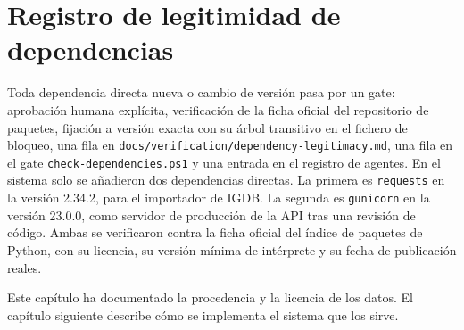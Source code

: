 \section{Registro de legitimidad de dependencias}\label{sec:datos-dependencias}

Toda dependencia directa nueva o cambio de versión pasa por un gate: aprobación humana
explícita, verificación de la ficha oficial del repositorio de paquetes, fijación a versión
exacta con su árbol transitivo en el fichero de bloqueo, una fila en
\texttt{docs/verification/dependency-legitimacy.md}, una fila en el gate
\texttt{check-dependencies.ps1} y una entrada en el registro de agentes. En el sistema solo
se añadieron dos dependencias directas. La primera es \texttt{requests} en la versión 2.34.2,
para el importador de IGDB. La segunda es \texttt{gunicorn} en la versión 23.0.0, como
servidor de producción de la API tras una revisión de código. Ambas se verificaron contra la
ficha oficial del índice de paquetes de Python, con su licencia, su versión mínima de
intérprete y su fecha de publicación reales.

Este capítulo ha documentado la procedencia y la licencia de los datos. El capítulo siguiente
describe cómo se implementa el sistema que los sirve.
